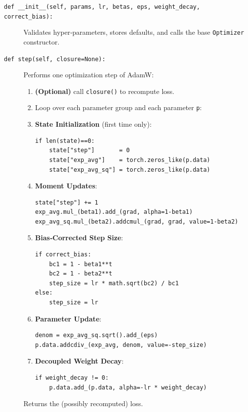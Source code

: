 \documentclass{article}
\theoremstyle{definition}
\begin{document}
\begin{description}

  \item[\texttt{def \_\_init\_\_(self, params, lr, betas, eps, weight\_decay, correct\_bias):}]  
    Validates hyper‐parameters, stores defaults, and calls the base \texttt{Optimizer} constructor.


  \item[\texttt{def step(self, closure=None):}]  
    Performs one optimization step of AdamW:
    \begin{enumerate}
      \item[(1)] \textbf{(Optional)} call \texttt{closure()} to recompute loss.
      \item[(2)] Loop over each parameter group and each parameter \texttt{p}:
      \item[(3)] \textbf{State Initialization} (first time only):
\begin{verbatim}
if len(state)==0:
    state["step"]       = 0
    state["exp_avg"]    = torch.zeros_like(p.data)
    state["exp_avg_sq"] = torch.zeros_like(p.data)
\end{verbatim}
      \item[(4)] \textbf{Moment Updates}:
\begin{verbatim}
state["step"] += 1
exp_avg.mul_(beta1).add_(grad, alpha=1-beta1)
exp_avg_sq.mul_(beta2).addcmul_(grad, grad, value=1-beta2)
\end{verbatim}
      \item[(5)] \textbf{Bias‐Corrected Step Size}:
\begin{verbatim}
if correct_bias:
    bc1 = 1 - beta1**t
    bc2 = 1 - beta2**t
    step_size = lr * math.sqrt(bc2) / bc1
else:
    step_size = lr
\end{verbatim}
      \item[(6)] \textbf{Parameter Update}:
\begin{verbatim}
denom = exp_avg_sq.sqrt().add_(eps)
p.data.addcdiv_(exp_avg, denom, value=-step_size)
\end{verbatim}
      \item[(7)] \textbf{Decoupled Weight Decay}:
\begin{verbatim}
if weight_decay != 0:
    p.data.add_(p.data, alpha=-lr * weight_decay)
\end{verbatim}
    \end{enumerate}
    Returns the (possibly recomputed) loss.
\end{description}




\end{document}
